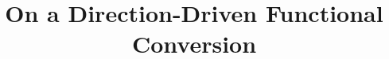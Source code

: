 \documentclass[sigplan,screen,review]{acmart}
\begin{document}
\title{On a Direction-Driven Functional Conversion}




\begin{comment}
\author{---------------------}
\email{-----------------------------}
\orcid{-------------------}
\affiliation{%
  \institution{------------------}
  \streetaddress{---------}
  \city{---------}
  \country{------}
  \postcode{-----}
}

\author{--------------}
\email{-----------------------------}
\affiliation{
  \institution{------------------}
  \city{---------}
  \country{-----}}

\author{-----------------}
\email{-----------------------------}
\affiliation{%
  \institution{------------------}
  \city{---------}
  \country{-----}
}
\end{comment}




\end{document}
